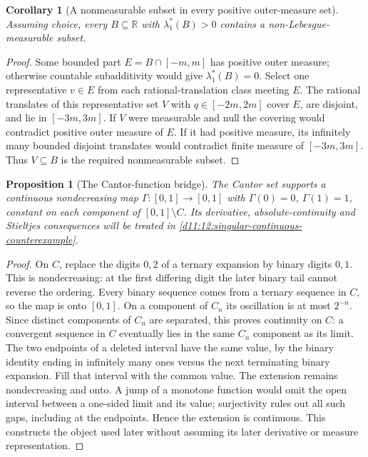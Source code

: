\documentclass[11pt,oneside,openany]{book}
\newtheorem{proposition}[theorem]{Proposition}
\newtheorem{corollary}[theorem]{Corollary}
\theoremstyle{definition}
\theoremstyle{remark}
\newcommand{\R}{\mathbb R}\newcommand{\C}{\mathbb C}
\newcommand{\family}[1]{}
\begin{document}
\begin{corollary}[A nonmeasurable subset in every positive outer-measure set]
\family{D11.03.positive_set_nonmeasurable_subset}\label{d11:03:positive-set-nonmeasurable-subset}
Assuming choice, every $B\subseteq\R$ with $\lambda_1^*(B)>0$ contains
a non-Lebesgue-measurable subset.
\end{corollary}
\begin{proof}
Some bounded part $E=B\cap[-m,m]$ has positive outer measure; otherwise
countable subadditivity would give $\lambda_1^*(B)=0$. Select one
representative $v\in E$ from each rational-translation class meeting $E$.
The rational translates of this representative set $V$ with
$q\in[-2m,2m]$ cover $E$, are disjoint, and lie in $[-3m,3m]$.
If $V$ were measurable and null the covering would contradict positive
outer measure of $E$. If it had positive measure, its infinitely many
bounded disjoint translates would contradict finite measure of $[-3m,3m]$.
Thus $V\subseteq B$ is the required nonmeasurable subset.
\end{proof}

\begin{proposition}[The Cantor-function bridge]
\family{D11.03.singular_function_route}\label{d11:03:singular-function-route}
The Cantor set supports a continuous nondecreasing map
$\Gamma:[0,1]\to[0,1]$ with $\Gamma(0)=0$, $\Gamma(1)=1$, constant on
each component of $[0,1]\setminus C$. Its derivative, absolute-continuity
and Stieltjes consequences will be treated in
\cref{d11:12:singular-continuous-counterexample}.
\end{proposition}
\begin{proof}
On $C$, replace the digits $0,2$ of a ternary expansion by binary digits
$0,1$. This is nondecreasing: at the first differing digit the later binary
tail cannot reverse the ordering. Every binary sequence comes from a ternary
sequence in $C$, so the map is onto $[0,1]$. On a component of $C_n$ its
oscillation is at most $2^{-n}$. Since distinct components of $C_n$ are
separated, this proves continuity on $C$: a convergent sequence in $C$
eventually lies in the same $C_n$ component as its limit.
The two endpoints of a deleted interval have the same value, by the binary
identity ending in infinitely many ones versus the next terminating binary
expansion. Fill that interval with the common value. The extension remains
nondecreasing and onto. A jump of a monotone function would omit the open
interval between a one-sided limit and its value; surjectivity rules out
all such gaps, including at the endpoints. Hence the extension is continuous.
This constructs the object used later without assuming its later derivative
or measure representation.
\end{proof}
\end{document}
